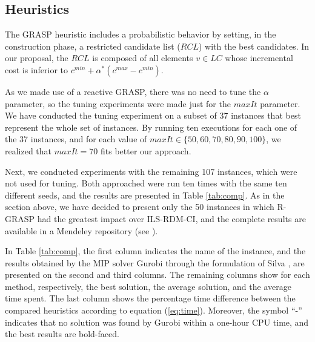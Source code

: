 \documentclass{ro}
\begin{document}
\subsection{Heuristics}

The GRASP heuristic includes a probabilistic behavior by setting, in the construction phase, a restricted candidate list ($RCL$) with the best candidates. In our proposal, the $RCL$ is composed of all elements \(v \in LC\) whose incremental cost is inferior to $c^{min} + \alpha^* (c^{max} - c^{min})$. 

As we made use of a reactive GRASP, there was no need to tune the $\alpha$ parameter, so the tuning experiments were made just for the $maxIt$ parameter. We have conducted the tuning experiment on a subset of 37 instances that best represent the whole set of instances. By running ten executions for each one of the 37 instances, and  for each value of $maxIt \in \{50,60,70,80,90,100\}$, we realized that $maxIt=70$ fits better our approach.


Next, we conducted experiments with the remaining 107 instances, which were not used for tuning. Both approached were run ten times with the same ten different seeds, and the results are presented in  Table \ref{tab:comp}. As in the section above, we have decided to present only the 50 instances in which R-GRASP had the greatest impact over ILS-RDM-CI, and the complete results are available in a Mendeley repository (see \cite{pcctp-data-complete}).

In Table \ref{tab:comp}, the first column indicates the name of the instance, and the results obtained by the MIP solver Gurobi through the formulation of  Silva \cite{silva2009problema}, are presented on the second and third columns. The remaining columns show for each method, respectively, the best solution, the average solution, and the average time spent. The last column shows the  percentage time difference between the compared heuristics according to equation (\ref{eq:time}). Moreover, the symbol ``-'' indicates that no solution was found by Gurobi within a one-hour CPU time, and the best results are bold-faced.
\end{document}

